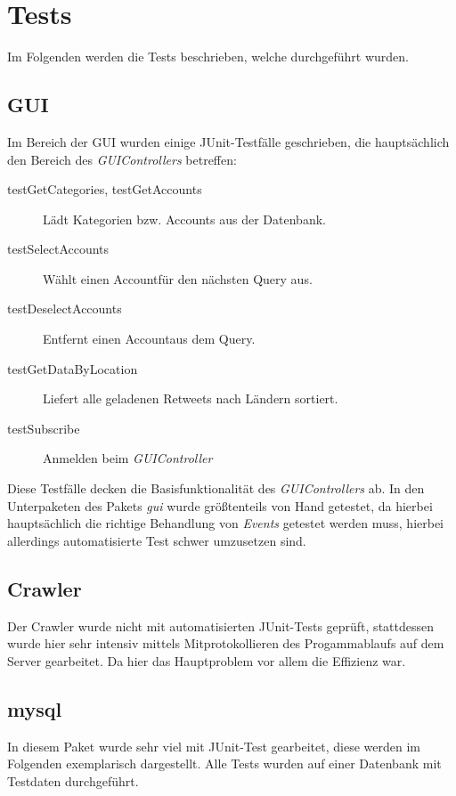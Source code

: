 \section{Tests}

Im Folgenden werden die Tests beschrieben, welche durchgeführt wurden. 

\subsection{GUI}

Im Bereich der GUI wurden einige JUnit-Testfälle geschrieben, die hauptsächlich den Bereich des \emph{GUIControllers} betreffen:
\begin{description}
	\item[testGetCategories, testGetAccounts] Lädt Kategorien bzw. Accounts aus der Datenbank.
	\item[testSelectAccounts] Wählt einen Account\footnotemark[1] für den nächsten Query aus.
	\item[testDeselectAccounts] Entfernt einen Account\footnotemark[1] aus dem Query.
	\item[testGetDataByLocation] Liefert alle geladenen Retweets nach Ländern sortiert.
	\item[testSubscribe] Anmelden beim \emph{GUIController}
\end{description}

Diese Testfälle decken die Basisfunktionalität des \emph{GUIControllers} ab. In den Unterpaketen des Pakets \emph{gui} wurde größtenteils von Hand getestet, da  hierbei hauptsächlich die richtige Behandlung von \emph{Events} getestet werden muss, hierbei allerdings automatisierte Test schwer umzusetzen sind.


\subsection{Crawler}

Der Crawler wurde nicht mit automatisierten JUnit-Tests geprüft, stattdessen wurde hier sehr intensiv mittels Mitprotokollieren des Progammablaufs auf dem Server gearbeitet. Da hier das Hauptproblem vor allem die Effizienz war.

\subsection{mysql}

In diesem Paket wurde sehr viel mit JUnit-Test gearbeitet, diese werden im Folgenden exemplarisch dargestellt. Alle Tests wurden auf einer Datenbank mit Testdaten durchgeführt.
